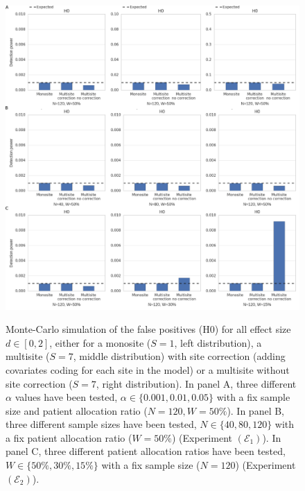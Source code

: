 \documentclass[authoryear]{elsarticle}
\begin{document}
\begin{figure}[tbp]
\centering
{\includegraphics[width=\textwidth]{../figures/h0_results.png}}

\caption{
Monte-Carlo simulation of the false positives (H0) for all effect size $d\in[0,2]$, either for a monosite ($S=1$, left distribution), a multisite ($S=7$, middle distribution) with site correction (adding covariates coding for each site in the model) or a multisite without site correction ($S=7$, right distribution). In panel A, three different $\alpha$ values have been tested, $\alpha\in \{0.001, 0.01, 0.05\}$ with a fix sample size and patient allocation ratio ($N=120,W=50\%$). In panel B, three different sample sizes have been tested, $N\in \{40, 80, 120\}$ with a fix patient allocation ratio ($W=50\%$) (Experiment $(\mathcal{E}_1)$). In panel C, three different patient allocation ratios have been tested, $W\in \{50\%, 30\%, 15\%\}$ with a fix sample size ($N=120$) (Experiment $(\mathcal{E}_2)$).}
\label{fig_h0}
\end{figure}
\end{document}
